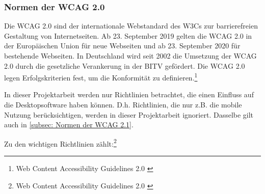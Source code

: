 \subsubsection{Normen der \ac{WCAG} 2.0}
Die \ac{WCAG} 2.0 sind der internationale Webstandard des \ac{W3C}s zur barrierefreien Gestaltung von Internetseiten. Ab 23. September 2019 gelten die \ac{WCAG} 2.0 in der Europäischen Union für neue Webseiten und ab 23. September 2020 für bestehende Webseiten. In Deutschland wird seit 2002 die Umsetzung der \ac{WCAG} 2.0 durch die gesetzliche Verankerung in der \ac{BITV} gefördert. Die \ac{WCAG} 2.0 legen Erfolgskriterien fest, um die Konformität zu definieren.\footnote{Web Content Accessibility Guidelines 2.0 \cite{WCAG2.0}}

In dieser Projektarbeit werden nur Richtlinien betrachtet, die einen Einfluss auf die Desktopsoftware haben können. D.h. Richtlinien, die nur z.B. die mobile Nutzung berücksichtigen, werden in dieser Projektarbeit ignoriert. Dasselbe gilt auch in \cref{subsec: Normen der WCAG 2.1}.

Zu den wichtigen Richtlinien zählt:\footnote{Web Content Accessibility Guidelines 2.0 \cite{WCAG2.0}}

